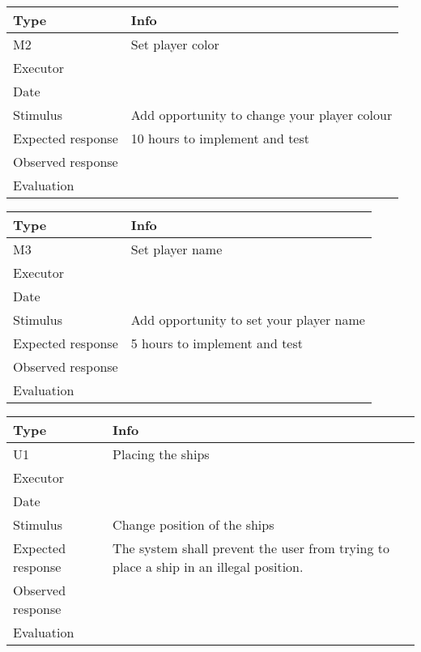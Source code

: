 \vspace{0.5em}

\noindent
\begin{tabular}{|p{3cm}|p{8.5cm}|}
	\hline
	\bf{Type}	& \bf{Info} \\
	\hline
	M2			& Set player color \\
	Executor	&  \\
	Date		& \date{\today} \\
	Stimulus	& Add opportunity to change your player colour \\
	Expected response & 10 hours to implement and test\\
	Observed response & \\
	Evaluation	& \\
	\hline
\end{tabular}

\vspace{0.5em}

\noindent
\begin{tabular}{|p{3cm}|p{8.5cm}|}
	\hline
	\bf{Type}	& \bf{Info} \\
	\hline
	M3			& Set player name \\
	Executor	&  \\
	Date		& \date{\today} \\
	Stimulus	& Add opportunity to set your player name \\
	Expected response & 5 hours to implement and test\\
	Observed response & \\
	Evaluation	&  \\
	\hline
\end{tabular}

\vspace{0.5em}

\noindent
\begin{tabular}{|p{3cm}|p{8.5cm}|}
	\hline
	\bf{Type}	& \bf{Info} \\
	\hline
	U1			& Placing the ships \\
	Executor	&  \\
	Date		& \date{\today} \\
	Stimulus	& Change position of the ships \\
	Expected response & The system shall prevent the user from trying to place a ship in an illegal position.\\
	Observed response & \\
	Evaluation	&  \\
	\hline
\end{tabular}

